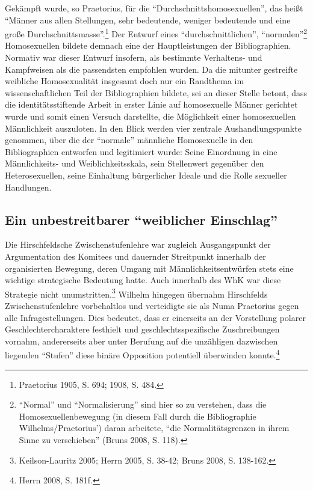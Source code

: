\documentclass[a4paper,
fontsize=11pt,
oneside,
numbers=noperiodatend,
parskip=half-,
bibliography=totoc,
final
]{scrartcl}
\begin{document}
Gekämpft wurde, so Praetorius, für die
\enquote{Durchschnittshomosexuellen}, das heißt \enquote{Männer aus
allen Stellungen, sehr bedeutende, weniger bedeutende und eine große
Durchschnittsmasse}.\footnote{Praetorius 1905, S. 694; 1908, S. 484.}
Der Entwurf eines \enquote{durchschnittlichen},
\enquote{normalen}\footnote{\enquote{Normal} und
  \enquote{Normalisierung} sind hier so zu verstehen, dass die
  Homosexuellenbewegung (in diesem Fall durch die Bibliographie
  Wilhelms/Praetorius') daran arbeitete, \enquote{die Normalitätsgrenzen
  in ihrem Sinne zu verschieben} (Bruns 2008, S. 118).} Homosexuellen
bildete demnach eine der Hauptleistungen der Bibliographien. Normativ
war dieser Entwurf insofern, als bestimmte Verhaltens- und Kampfweisen
als die passendsten empfohlen wurden. Da die mitunter gestreifte
weibliche Homosexualität insgesamt doch nur ein Randthema im
wissenschaftlichen Teil der Bibliographien bildete, sei an dieser Stelle
betont, dass die identitätsstiftende Arbeit in erster Linie auf
homosexuelle Männer gerichtet wurde und somit einen Versuch darstellte,
die Möglichkeit einer homosexuellen Männlichkeit auszuloten. In den
Blick werden vier zentrale Aushandlungspunkte genommen, über die der
\enquote{normale} männliche Homosexuelle in den Bibliographien entworfen
und legitimiert wurde: Seine Einordnung in eine Männlichkeits- und
Weiblichkeitsskala, sein Stellenwert gegenüber den Heterosexuellen,
seine Einhaltung bürgerlicher Ideale und die Rolle sexueller Handlungen.

\subsection*{\texorpdfstring{Ein unbestreitbarer \enquote{weiblicher
Einschlag}}{Ein unbestreitbarer weiblicher Einschlag}}\label{ein-unbestreitbarer-weiblicher-einschlag}

Die Hirschfeldsche Zwischenstufenlehre war zugleich Ausgangspunkt der
Argumentation des Komitees und dauernder Streitpunkt innerhalb der
organisierten Bewegung, deren Umgang mit Männlichkeitsentwürfen stets
eine wichtige strategische Bedeutung hatte. Auch innerhalb des WhK war
diese Strategie nicht unumstritten.\footnote{Keilson-Lauritz 2005; Herrn
  2005, S. 38-42; Bruns 2008, S. 138-162.} Wilhelm hingegen übernahm
Hirschfelds Zwischenstufenlehre vorbehaltlos und verteidigte sie als
Numa Praetorius gegen alle Infragestellungen. Dies bedeutet, dass er
einerseits an der Vorstellung polarer Geschlechtercharaktere festhielt
und geschlechtsspezifische Zuschreibungen vornahm, andererseits aber
unter Berufung auf die unzähligen dazwischen liegenden \enquote{Stufen}
diese binäre Opposition potentiell überwinden konnte.\footnote{Herrn
  2008, S. 181f.}
\end{document}
